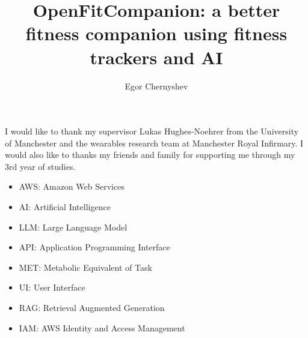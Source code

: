 \documentclass[12pt,BSc,wordcount]{muthesis}
\begin{document}

\title{OpenFitCompanion: a better fitness companion using fitness trackers and AI}
\author{Egor Chernyshev}

\beforeabstract



\afterabstract

I would like to thank my supervisor Lukas Hughes-Noehrer from the University of Manchester and the 
wearables research team at Manchester Royal Infirmary. I would also like to thanks my friends and family
for supporting me through my 3rd year of studies. 

\afterpreface

\begin{itemize}
  \item AWS: Amazon Web Services
  \item AI: Artificial Intelligence
  \item LLM: Large Language Model
  \item API: Application Programming Interface
  \item MET: Metabolic Equivalent of Task
  \item UI: User Interface
  \item RAG: Retrieval Augmented Generation
  \item IAM: AWS Identity and Access Management
\end{itemize}










\end{document}

